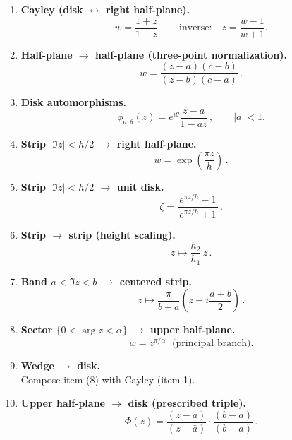 \documentclass[12pt,a4paper]{article}
\begin{document}
	\begin{enumerate}
		\item \textbf{Cayley (disk $\leftrightarrow$ right half-plane).}\\[2pt]
		\[
		\boxed{\,w=\frac{1+z}{1-z}\,}\qquad\text{inverse:}\quad z=\frac{w-1}{w+1}.
		\]
		
		\item \textbf{Half-plane $\to$ half-plane (three-point normalization).}\\[2pt]
		\[
		\boxed{\,w=\frac{(z-a)(c-b)}{(z-b)(c-a)}\,}.
		\]
		
		\item \textbf{Disk automorphisms.}\\[2pt]
		\[
		\boxed{\,\phi_{a,\theta}(z)=e^{i\theta}\frac{z-a}{1-\bar a z}\,},\qquad |a|<1.
		\]
		
		\item \textbf{Strip $|\Im z|<h/2$ $\to$ right half-plane.}\\[2pt]
		\[
		\boxed{\,w=\exp\!\left(\frac{\pi z}{h}\right)\,}.
		\]
		
		\item \textbf{Strip $|\Im z|<h/2$ $\to$ unit disk.}\\[2pt]
		\[
		\boxed{\,\zeta=\frac{e^{\pi z/h}-1}{\,e^{\pi z/h}+1\,}\,}.
		\]
		
		\item \textbf{Strip $\to$ strip (height scaling).}\\[2pt]
		\[
		\boxed{\,z\mapsto \frac{h_2}{h_1}\,z\,}.
		\]
		
		\item \textbf{Band $a<\Im z<b$ $\to$ centered strip.}\\[2pt]
		\[
		\boxed{\,z\mapsto \frac{\pi}{b-a}\!\left(z-i\frac{a+b}{2}\right)\,}.
		\]
		
		\item \textbf{Sector $\{0<\arg z<\alpha\}$ $\to$ upper half-plane.}\\[2pt]
		\[
		\boxed{\,w=z^{\pi/\alpha}\,}\ \ \text{(principal branch)}.
		\]
		
		\item \textbf{Wedge $\to$ disk.}\\[2pt]
		Compose item (8) with Cayley (item 1).
		
		\item \textbf{Upper half-plane $\to$ disk (prescribed triple).}\\[2pt]
		\[
		\boxed{\,\Phi(z)=\frac{(z-a)}{(z-\bar a)}\cdot \frac{(b-\bar a)}{(b-a)}\,}.
		\]
		

\end{enumerate}
\end{document}
